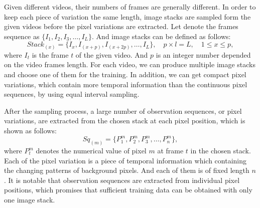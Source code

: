 \documentclass[journal]{IEEEtran}
\begin{document}
Given different videos, their numbers of frames are generally different. 
In order to keep each piece of variation the same length, image stacks are sampled form the given videos before the pixel variations are extracted. 
Let denote the frames sequence as $\{ I_1,I_2,I_3,\dots,I_L\}$.
And image stacks can be defined as follows: 
\begin{equation}
Stack_{(x)}=\{I_x,I_{(x+p)},I_{(x+2p)},\dots,I_L \},\quad p\times l=L,\quad 1\leq   x\leq p , 
\end{equation}
where $I_t$ is the frame $t$ of the given video. 
And $p$ is an integer number depended on the video frames length. 
For each video, we can produce multiple image stacks and choose one of them for the training. 
In addition, we can get compact pixel variations, which contain more temporal information than the continuous pixel sequences, by using equal interval sampling. 

After the sampling process, a large number of observation sequences, or pixel variations, are extracted from the chosen stack at each pixel position, which is shown as follows: 
\begin{equation}
Sq_{(m)}=\{P_1^m,P_2^m,P_3^m,\dots,P_n^m\},
\end{equation}
where $P_t^m$ denotes the numerical value of pixel $m$ at frame $t$ in the chosen stack. 
Each of the pixel variation is a piece of temporal information which containing the changing patterns of background pixels. 
And each of them is of fixed length $n$. 
It is notable that observation sequences are extracted from individual pixel positions, which promises that sufficient training data can be obtained with only one image stack.
\end{document}
